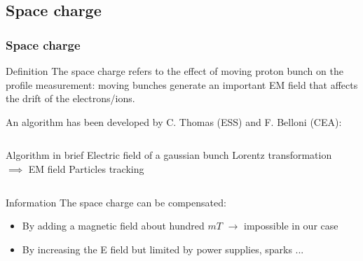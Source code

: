 \subsection{Space charge}
\begin{frame}
  \frametitle{Space charge}
  \begin{block}{Definition}
    The space charge refers to the effect of moving proton bunch on the profile measurement: moving bunches generate an important EM field that affects the drift of the electrons/ions.
  \end{block}
  An algorithm has been developed by C. Thomas (ESS) and F. Belloni (CEA):
  \begin{columns}
    \begin{column}{0.45\textwidth}
      \begin{block}{Algorithm in brief}
        Electric field of a gaussian bunch
        Lorentz transformation $\implies$ EM field
        Particles tracking
      \end{block}
    \end{column}
    \begin{column}{0.45\textwidth}
    \end{column}
  \end{columns}
  \begin{block}{Information}
    The space charge can be compensated:
    \begin{itemize}
      \item By adding a magnetic field about hundred $mT$ $\rightarrow$ impossible in our case
      \item By increasing the E field but limited by power supplies, sparks ...
    \end{itemize}
  \end{block}
\end{frame}

